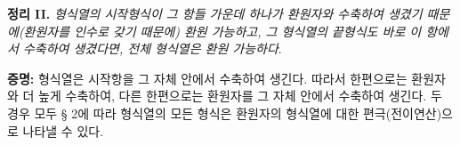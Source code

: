 
\textbf{정리 II.} \emph{형식열의 시작형식이 그 항들 가운데 하나가 환원자와 수축하여 생겼기 때문에(환원자를 인수로 갖기 때문에) 환원 가능하고, 그 형식열의 끝형식도 바로 이 항에서 수축하여 생겼다면, 전체 형식열은 환원 가능하다}.

\textbf{증명:} 형식열은 시작항을 그 자체 안에서 수축하여 생긴다. 따라서 한편으로는 환원자와 더 높게 수축하여, 다른 한편으로는 환원자를 그 자체 안에서 수축하여 생긴다. 두 경우 모두 § 2에 따라 형식열의 모든 형식은 환원자의 형식열에 대한 편극(전이연산)으로 나타낼 수 있다.
